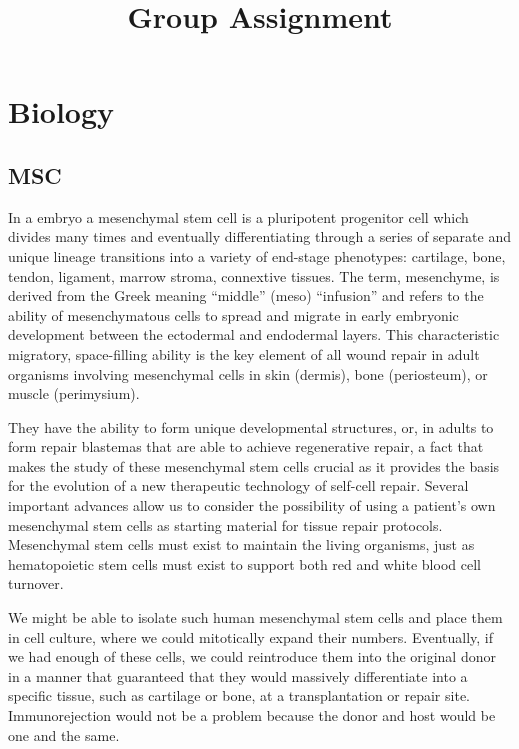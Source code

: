 \documentclass[12pt]{article}
\title{Group Assignment}
\begin{document}
\maketitle

\section{Biology}

\subsection{MSC}

In a embryo a mesenchymal stem cell is a pluripotent progenitor cell which divides many times and eventually differentiating through a series of separate and unique lineage transitions into a variety of end-stage phenotypes: cartilage, bone, tendon, ligament, marrow stroma, connextive tissues.
The term, mesenchyme, is derived from the Greek meaning “middle” (meso) “infusion” and refers to the ability of mesenchymatous cells to spread and migrate in early embryonic development between the ectodermal and endodermal layers.
This characteristic migratory, space-filling ability is the key element of all wound repair in adult organisms involving mesenchymal cells in skin (dermis), bone (periosteum), or muscle (perimysium).

They have the ability to form unique developmental structures, or, in adults to form repair blastemas that are able to achieve  regenerative repair, a fact that makes the study of these mesenchymal stem cells crucial as it provides the basis for the evolution of a new therapeutic technology of self-cell repair. 
Several important advances allow us to consider the possibility of using a patient’s own mesenchymal stem cells as starting material for tissue repair protocols.
Mesenchymal stem cells must exist to maintain the living organisms, just as hematopoietic stem cells must exist to support both red and white blood cell turnover. 

We might be able to isolate such human mesenchymal stem cells and place them in cell culture, where we could mitotically expand their numbers. Eventually, if we had enough of these cells, we could reintroduce them into the original donor in a manner that guaranteed that they would massively differentiate into a specific tissue, such as cartilage or bone, at a transplantation or repair site. Immunorejection would not be a problem because the donor and host would be one and the same.
\end{document}
